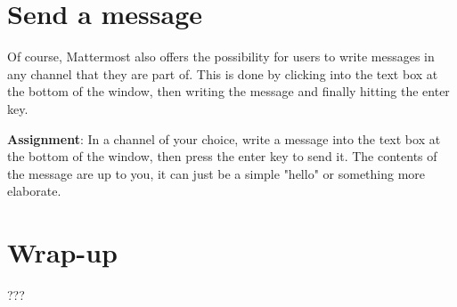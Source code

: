 \documentclass[paper=a4, fontsize=11pt]{scrartcl} %
\numberwithin{equation}{section} %
\numberwithin{figure}{section} %
\numberwithin{table}{section} %
\begin{document}
\section{Send a message}
\label{task4}

Of course, Mattermost also offers the possibility for users to write messages in any channel that they are part of.
This is done by clicking into the text box at the bottom of the window, then writing the message and finally hitting the enter key.

\textbf{Assignment}: In a channel of your choice, write a message into the text box at the bottom of the window, then press the enter key to send it.
The contents of the message are up to you, it can just be a simple "hello" or something more elaborate.


\section{Wrap-up}
\label{wrapup}

???

%
%
%
%
%

\end{document}
